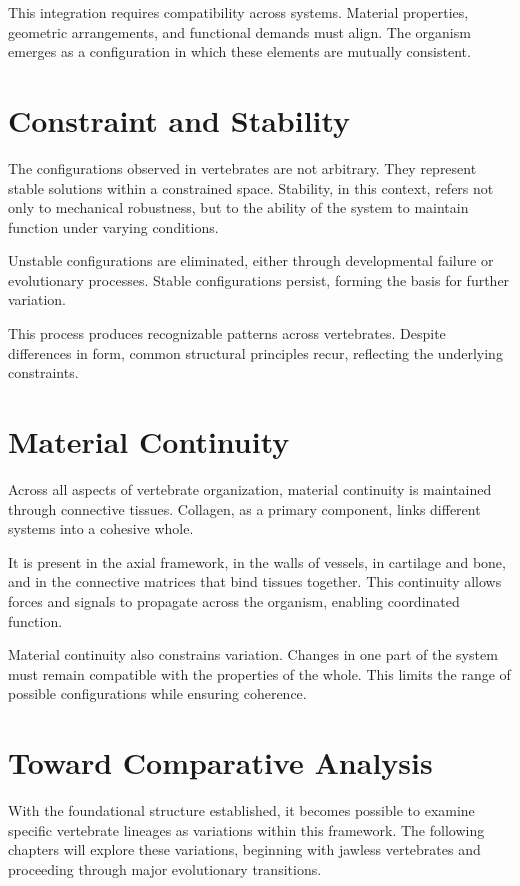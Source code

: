 \documentclass[11pt,oneside]{book}
\begin{document}
This integration requires compatibility across systems. Material properties, geometric arrangements, and functional demands must align. The organism emerges as a configuration in which these elements are mutually consistent.

\section{Constraint and Stability}

The configurations observed in vertebrates are not arbitrary. They represent stable solutions within a constrained space. Stability, in this context, refers not only to mechanical robustness, but to the ability of the system to maintain function under varying conditions.

Unstable configurations are eliminated, either through developmental failure or evolutionary processes. Stable configurations persist, forming the basis for further variation.

This process produces recognizable patterns across vertebrates. Despite differences in form, common structural principles recur, reflecting the underlying constraints.

\section{Material Continuity}

Across all aspects of vertebrate organization, material continuity is maintained through connective tissues. Collagen, as a primary component, links different systems into a cohesive whole.

It is present in the axial framework, in the walls of vessels, in cartilage and bone, and in the connective matrices that bind tissues together. This continuity allows forces and signals to propagate across the organism, enabling coordinated function.

Material continuity also constrains variation. Changes in one part of the system must remain compatible with the properties of the whole. This limits the range of possible configurations while ensuring coherence.

\section{Toward Comparative Analysis}

With the foundational structure established, it becomes possible to examine specific vertebrate lineages as variations within this framework. The following chapters will explore these variations, beginning with jawless vertebrates and proceeding through major evolutionary transitions.
\end{document}
